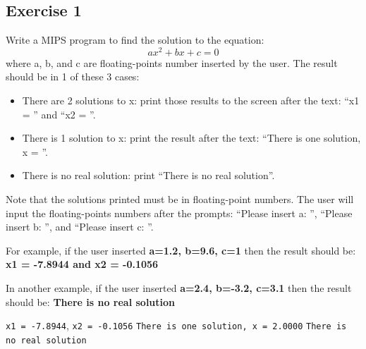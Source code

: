 \subsection{Exercise 1}
Write a MIPS program to find the solution to the equation:
\begin{equation}
  ax^2 + bx + c = 0
\end{equation}
where a, b, and c are floating-points number inserted by the user. The result
should be in 1 of these 3 cases:
\begin{itemize}
  \item There are 2 solutions to x: print those results to the screen after the
        text: ``x1 = '' and ``x2 = ''.
  \item There is 1 solution to x: print the result after the text: ``There is one
        solution, x = ''.
  \item There is no real solution: print ``There is no real solution''.
\end{itemize}
Note that the solutions printed must be in floating-point numbers. The user
will input the floating-points numbers after the prompts: ``Please insert a: '',
``Please insert b: '', and ``Please insert c: ''.

For example, if the user inserted \textbf{a=1.2, b=9.6, c=1} then the result
should be: \textbf{x1 = -7.8944 and x2 = -0.1056}

In another example, if the user inserted \textbf{a=2.4, b=-3.2, c=3.1} then the
result should be: \textbf{There is no real solution}

%
  {\texttt{x1 = -7.8944}, \texttt{x2 = -0.1056}}
%
  {\texttt{There is one solution, x = 2.0000}}
%
  {\texttt{There is no real solution}}

